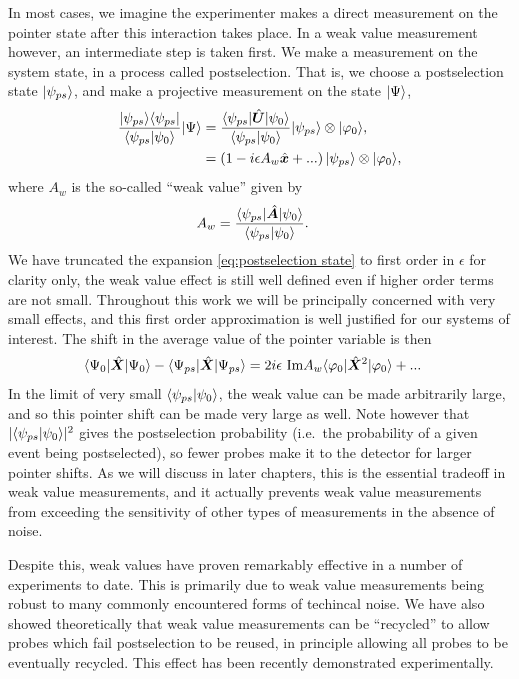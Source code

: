 In most cases, we imagine the experimenter makes a direct measurement on the pointer state after this interaction takes place.  In a weak value measurement however, an intermediate step is taken first.  We make a measurement on the system state, in a process called postselection.  That is, we choose a postselection state $\lvert \psi_{ps}\rangle$, and make a projective measurement on the state $\lvert \Psi\rangle$,
\begin{align}\label{eq:postselection state}
  \nonumber \frac{\lvert \psi_{ps}\rangle\langle \psi_{ps} \rvert}{\langle \psi_{ps} \vert \psi_0 \rangle} \lvert \Psi\rangle &= \frac{\langle \psi_{ps} \rvert\hat{\bm U}\lvert \psi_0\rangle}{\langle \psi_{ps} \vert \psi_0 \rangle}\lvert \psi_{ps}\rangle \otimes \lvert \varphi_0\rangle, \\
                                                                      &= \left(1 - i\epsilon A_w \hat{\bm x} + ...  \right)\lvert \psi_{ps}\rangle \otimes \lvert \varphi_0\rangle,
\end{align}
where $A_w$ is the so-called ``weak value'' given by
\begin{align}
  A_w &= \frac{\langle \psi_{ps} \rvert\hat{\bm A}\lvert \psi_0\rangle}{\langle \psi_{ps} \vert \psi_0 \rangle}.
\end{align}
We have truncated the expansion \eqref{eq:postselection state} to first order in $\epsilon$ for clarity only, the weak value effect is still well defined even if higher order terms are not small.  Throughout this work we will be principally concerned with very small effects, and this first order approximation is well justified for our systems of interest.  The shift in the average value of the pointer variable is then
\begin{align}
  \langle \Psi_0 \rvert\hat{\bm X}\lvert \Psi_0\rangle - \langle \Psi_{ps} \rvert\hat{\bm X}\lvert \Psi_{ps}\rangle &= 2i\epsilon ~\text{Im}{A_w} \langle \varphi_0 \rvert\hat{\bm X}^2\lvert \varphi_0\rangle + ...
\end{align}
In the limit of very small $\langle \psi_{ps} \vert \psi_0 \rangle$, the weak value can be made arbitrarily large, and so this pointer shift can be made very large as well.  Note however that $|\langle \psi_{ps} \vert \psi_0 \rangle|^2$ gives the postselection probability (i.e.~the probability of a given event being postselected), so fewer probes make it to the detector for larger pointer shifts.  As we will discuss in later chapters, this is the essential tradeoff in weak value measurements, and it actually prevents weak value measurements from exceeding the sensitivity of other types of measurements in the absence of noise.

Despite this, weak values have proven remarkably effective in a number of experiments to date.  This is primarily due to weak value measurements being robust to many commonly encountered forms of techincal noise.  We have also showed theoretically that weak value measurements can be ``recycled'' to allow probes which fail postselection to be reused, in principle allowing all probes to be eventually recycled.  This effect has been recently demonstrated experimentally.


